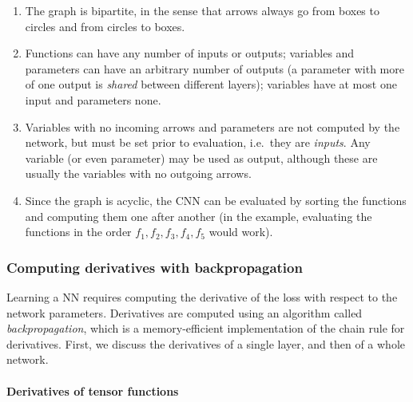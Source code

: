 \begin{enumerate}
	\item The graph is bipartite, in the sense that arrows always go from boxes to circles and from circles to boxes. 
	\item Functions can have any number of inputs or outputs; variables and parameters can have an arbitrary number of outputs (a parameter with more of one output is \emph{shared} between different layers); variables have at most one input and parameters none. 
	\item Variables with no incoming arrows and parameters are not computed by the network, but must be set prior to evaluation, i.e.\ they are \emph{inputs}. Any variable (or even parameter) may be used as output, although these are usually the variables with no outgoing arrows.
	\item Since the graph is acyclic, the CNN can be evaluated by sorting the functions and computing them one after another (in the example, evaluating the functions in the order $f_1,f_2,f_3,f_4,f_5$ would work).
\end{enumerate}

\subsubsection{Computing derivatives with backpropagation}\label{s:back}

Learning a NN requires computing the derivative of the loss with respect to the network parameters. Derivatives are computed using an algorithm called \emph{backpropagation}, which is a memory-efficient implementation of the chain rule for derivatives. First, we discuss the derivatives of a single layer, and then of a whole network.

\paragraph{Derivatives of tensor functions}

